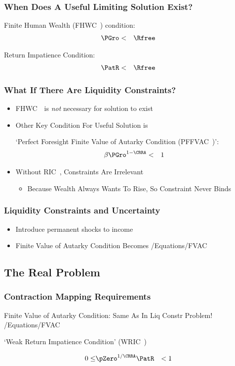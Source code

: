 \documentclass[pdflatex]{beamer}\providecommand{\texname}{BufferStockTheory-Slides}%
\newcommand{\PFFVAC}{\mbox{PFFVAC~}}
\newcommand{\RIC}{\mbox{RIC~}}
\newcommand{\WRIC}{\mbox{WRIC~}}
\newcommand{\FHWC}{\mbox{FHWC~}}
\providecommand{\EqDir}{\econtexRoot/Equations}
\begin{document}
\begin{frame}
\frametitle{When Does A Useful Limiting Solution Exist?}

Finite Human Wealth (\FHWC) condition:
\begin{eqnarray}
\PGro & < & \Rfree
\end{eqnarray}

\pause\medskip
Return Impatience Condition:
\begin{eqnarray}
\PatR & < & \Rfree
\end{eqnarray}

\end{frame}

\begin{frame}
\frametitle{What If There Are Liquidity Constraints?}

\pause 

\begin{itemize}
\item \FHWC~is {\it not} necessary for solution to exist
\item Other Key Condition For Useful Solution is

`Perfect Foresight Finite Value of Autarky Condition (\PFFVAC)':
\begin{eqnarray}
\beta \PGro^{1-\CRRA} & < & 1  
\end{eqnarray}

\item Without \RIC, Constraints Are Irrelevant
\begin{itemize}
\item Because Wealth Always Wants To Rise, So Constraint Never Binds
\end{itemize}
\end{itemize}

\end{frame}

\begin{frame}
\frametitle{Liquidity Constraints and Uncertainty}

\begin{itemize}
\item Introduce permanent shocks to income
\item Finite Value of Autarky Condition Becomes
 \EqDir/FVAC
\end{itemize}

\end{frame}



\subsection{The Real Problem}
\begin{frame}
\frametitle{Contraction Mapping Requirements}

Finite Value of Autarky Condition: Same As In Liq Constr Problem!
 \EqDir/FVAC

`Weak Return Impatience Condition' (\WRIC)

\begin{eqnarray}
 0 \leq & \pZero^{1/\CRRA} \PatR & < 1 \label{eq:WRIC}
\end{eqnarray}

\end{frame}
\end{document}
